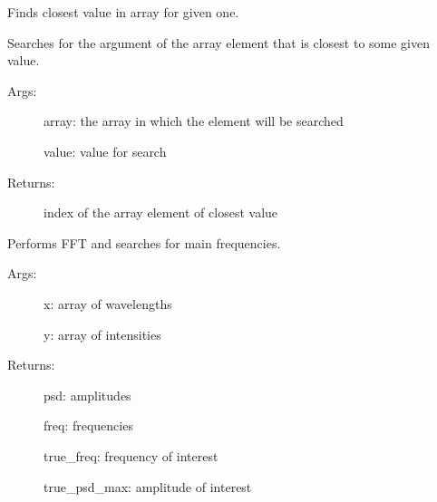 \documentclass[letterpaper,10pt,english]{sphinxmanual}
\begin{document}
\begin{fulllineitems}
\label{\detokenize{GUI:GUI.find_nearest}}
Finds closest value in array for given one.

Searches for the argument of the array element that is closest to some given value.
\begin{description}
\item[{Args:}] \leavevmode
array: the array in which the element will be searched

value: value for search

\item[{Returns:}] \leavevmode
index of the array element of closest value

\end{description}

\end{fulllineitems}


\begin{fulllineitems}
\label{\detokenize{GUI:GUI.fourier_analysis}}
Performs FFT and searches for main frequencies.
\begin{description}
\item[{Args:}] \leavevmode
x: array of wavelengths

y: array of intensities

\item[{Returns:}] \leavevmode
psd: amplitudes

freq: frequencies

true\_freq: frequency of interest

true\_psd\_max: amplitude of interest

\end{description}

\end{fulllineitems}

\end{document}
